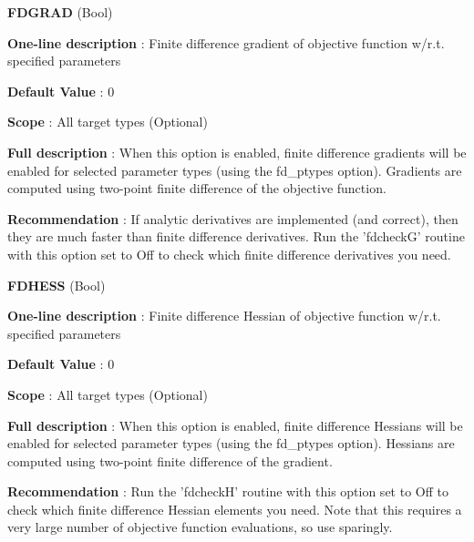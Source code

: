 \begin{DoxyItemize}
\item {\bfseries  F\-D\-G\-R\-A\-D } (Bool) \par
{\bfseries  One-\/line description }\-: Finite difference gradient of objective function w/r.\-t. specified parameters \par
{\bfseries  Default Value }\-: 0 \par
{\bfseries  Scope }\-: All target types (Optional) \par
{\bfseries  Full description }\-: When this option is enabled, finite difference gradients will be enabled for selected parameter types (using the fd\-\_\-ptypes option). Gradients are computed using two-\/point finite difference of the objective function. \par
{\bfseries  Recommendation }\-: If analytic derivatives are implemented (and correct), then they are much faster than finite difference derivatives. Run the 'fdcheck\-G' routine with this option set to Off to check which finite difference derivatives you need.\end{DoxyItemize}
\begin{DoxyItemize}
\item {\bfseries  F\-D\-H\-E\-S\-S } (Bool) \par
{\bfseries  One-\/line description }\-: Finite difference Hessian of objective function w/r.\-t. specified parameters \par
{\bfseries  Default Value }\-: 0 \par
{\bfseries  Scope }\-: All target types (Optional) \par
{\bfseries  Full description }\-: When this option is enabled, finite difference Hessians will be enabled for selected parameter types (using the fd\-\_\-ptypes option). Hessians are computed using two-\/point finite difference of the gradient. \par
{\bfseries  Recommendation }\-: Run the 'fdcheck\-H' routine with this option set to Off to check which finite difference Hessian elements you need. Note that this requires a very large number of objective function evaluations, so use sparingly.\end{DoxyItemize}
